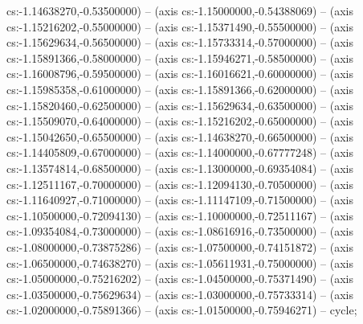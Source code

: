 cs:-1.14638270,-0.53500000) -- (axis cs:-1.15000000,-0.54388069) -- (axis cs:-1.15216202,-0.55000000) -- (axis cs:-1.15371490,-0.55500000) -- (axis cs:-1.15629634,-0.56500000) -- (axis cs:-1.15733314,-0.57000000) -- (axis cs:-1.15891366,-0.58000000) -- (axis cs:-1.15946271,-0.58500000) -- (axis cs:-1.16008796,-0.59500000) -- (axis cs:-1.16016621,-0.60000000) -- (axis cs:-1.15985358,-0.61000000) -- (axis cs:-1.15891366,-0.62000000) -- (axis cs:-1.15820460,-0.62500000) -- (axis cs:-1.15629634,-0.63500000) -- (axis cs:-1.15509070,-0.64000000) -- (axis cs:-1.15216202,-0.65000000) -- (axis cs:-1.15042650,-0.65500000) -- (axis cs:-1.14638270,-0.66500000) -- (axis cs:-1.14405809,-0.67000000) -- (axis cs:-1.14000000,-0.67777248) -- (axis cs:-1.13574814,-0.68500000) -- (axis cs:-1.13000000,-0.69354084) -- (axis cs:-1.12511167,-0.70000000) -- (axis cs:-1.12094130,-0.70500000) -- (axis cs:-1.11640927,-0.71000000) -- (axis cs:-1.11147109,-0.71500000) -- (axis cs:-1.10500000,-0.72094130) -- (axis cs:-1.10000000,-0.72511167) -- (axis cs:-1.09354084,-0.73000000) -- (axis cs:-1.08616916,-0.73500000) -- (axis cs:-1.08000000,-0.73875286) -- (axis cs:-1.07500000,-0.74151872) -- (axis cs:-1.06500000,-0.74638270) -- (axis cs:-1.05611931,-0.75000000) -- (axis cs:-1.05000000,-0.75216202) -- (axis cs:-1.04500000,-0.75371490) -- (axis cs:-1.03500000,-0.75629634) -- (axis cs:-1.03000000,-0.75733314) -- (axis cs:-1.02000000,-0.75891366) -- (axis cs:-1.01500000,-0.75946271) -- cycle;
